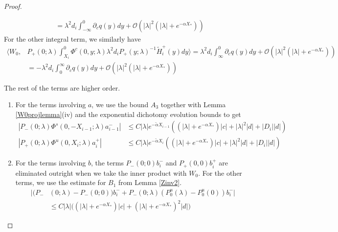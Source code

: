 \documentclass[thesis.tex]{subfiles}
\begin{document}
\begin{lemma}
\begin{proof}
\begin{enumerate}
\begin{align*}
&= \lambda^2 d_i \int_{-\infty}^0 \partial_c q(y)dy + \mathcal{O}(|\lambda|^2( |\lambda| + e^{-\alpha X_*})) 
\end{align*}
For the other integral term, we similarly have
\begin{align*}
\langle W_0, &P_+(0; \lambda) \int_{X_i}^0 \Phi^c(0, y; \lambda) \lambda^2 d_i P_+(y; \lambda)^{-1} \tilde{H}_i^+(y) dy \rangle = \lambda^2 d_i \int_{\infty}^0 \partial_c q(y)dy + \mathcal{O}(|\lambda|^2( |\lambda| + e^{-\alpha X_*})) \\
&= -\lambda^2 d_i \int_0^{\infty} \partial_c q(y)dy + \mathcal{O}(|\lambda|^2( |\lambda| + e^{-\alpha X_*}))
\end{align*}
\end{enumerate}

The rest of the terms are higher order.
\begin{enumerate}

\item For the terms involving $a$, we use the bound $A_3$ together with Lemma \ref{W0projlemma}(iv) and the exponential dichotomy evolution bounds to get
\begin{align*}
|P_-(0; \lambda) \Phi^s(0, -X_{i-1}; \lambda) a_{i-1}^-| &\leq C |\lambda| e^{-\tilde{\alpha} X_{i-1}} \left( (|\lambda| + e^{-\alpha X_*})|c| + |\lambda|^2 |d| + |D_i||d| \right) \\
|P_+(0; \lambda) \Phi^u(0, X_i; \lambda) a_i^+| &\leq C |\lambda| e^{-\tilde{\alpha} X_i}\left( (|\lambda| + e^{-\alpha X_*})|c| + |\lambda|^2 |d| + |D_i||d| \right) 
\end{align*} 

\item For the terms involving $b$, the terms $P_-(0; 0) b_i^-$ and $P_+(0, 0)b_i^+$ are eliminated outright when we take the inner product with $W_0$. For the other terms, we use the estimate for $B_1$ from Lemma \ref{Zinv2}.
\begin{align*}
|(P_-&(0; \lambda) - P_-(0; 0))b_i^- + P_-(0; \lambda)(P_0^u(\lambda) - P_0^u(0))b_i^-| \\
&\leq C |\lambda|\Big( (|\lambda| + e^{-\alpha X_*})|c| + (|\lambda| + e^{-\alpha X_*})^2 |d| \Big)
\end{align*}


\end{enumerate}
\end{proof}
\end{lemma}
\end{document}
